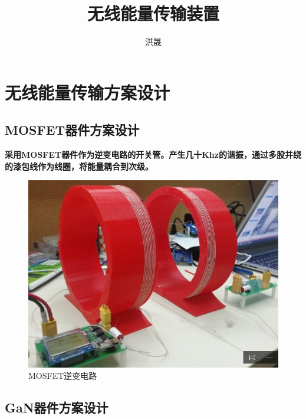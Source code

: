 ﻿\documentclass[UTF-8,a4paper,12pt]{ctexart}
\title{无线能量传输装置}%
\author{洪晟}%
\begin{document}
\makeatletter
\renewcommand{\tablename}{表}
\renewcommand{\figurename}{图}
\renewcommand{\thefigure}{\thesection.\arabic{figure}\quad}
\renewcommand{\thetable}{\thesection.\arabic{table}\quad}
\makeatother

\maketitle

    \newpage
    \pagestyle{fancy}

\section{无线能量传输方案设计}



    \subsection{MOSFET器件方案设计}

        {\bf{采用MOSFET器件作为逆变电路的开关管。产生几十Khz的谐振，通过多股并绕的漆包线作为线圈，将能量耦合到次级。}}
        \begin{figure}[H]
          \centering
          \includegraphics[scale=0.6]{wire1.jpg}
          \caption{MOSFET逆变电路}
          \label{图1 MOSFET逆变电路}
        \end{figure}


    \subsection{GaN器件方案设计}
\end{document}
